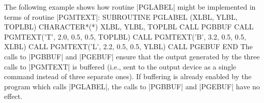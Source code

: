The following example shows how routine |PGLABEL| might be implemented
in terms of routine |PGMTEXT|: 
\begintt
SUBROUTINE PGLABEL (XLBL, YLBL, TOPLBL)
CHARACTER*(*) XLBL, YLBL, TOPLBL
CALL PGBBUF
CALL PGMTEXT('T', 2.0, 0.5, 0.5, TOPLBL)
CALL PGMTEXT('B', 3.2, 0.5, 0.5, XLBL)
CALL PGMTEXT('L', 2.2, 0.5, 0.5, YLBL)
CALL PGEBUF
END
\endtt
The calls to |PGBBUF| and |PGEBUF| ensure that the output generated by the
three calls to |PGMTEXT| is buffered (i.e., sent to the output device as a
single command instead of three separate ones). If buffering is already
enabled by the program which calls |PGLABEL|, the calls to |PGBBUF| and
|PGEBUF| have no effect. 

\endchapter
